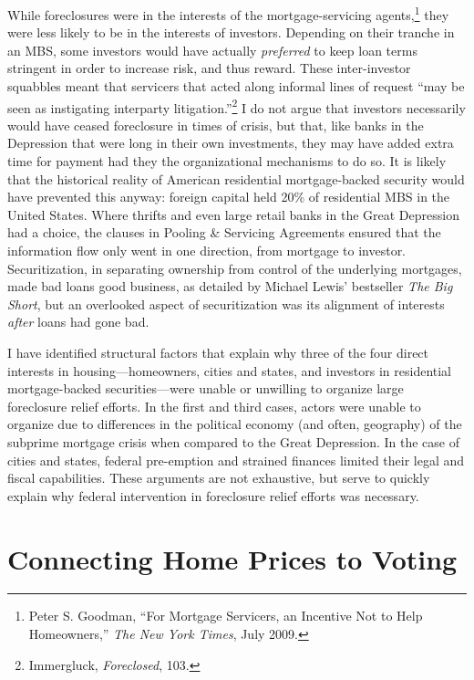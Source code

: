\documentclass[12pt,oneside]{psthesis}
\begin{document}
While foreclosures were in the interests of the mortgage-servicing agents,\footnote{Peter S. Goodman, ``For Mortgage Servicers, an Incentive Not to Help Homeowners,'' \emph{The New York Times}, July 2009.} they were less likely to be in the interests of investors.
Depending on their tranche in an MBS, some investors would have actually \emph{preferred} to keep loan terms stringent in order to increase risk, and thus reward.
These inter-investor squabbles meant that servicers that acted along informal lines of request ``may be seen as instigating interparty litigation.''\footnote{Immergluck, \emph{Foreclosed}, 103.}
I do not argue that investors necessarily would have ceased foreclosure in times of crisis, but that, like banks in the Depression that were long in their own investments, they may have added extra time for payment had they the organizational mechanisms to do so.
It is likely that the historical reality of American residential mortgage-backed security would have prevented this anyway: foreign capital held 20\% of residential MBS in the United States.
Where thrifts and even large retail banks in the Great Depression had a choice, the clauses in Pooling \& Servicing Agreements ensured that the information flow only went in one direction, from mortgage to investor.
Securitization, in separating ownership from control of the underlying mortgages, made bad loans good business, as detailed by Michael Lewis' bestseller \emph{The Big Short}, but an overlooked aspect of securitization was its alignment of interests \emph{after} loans had gone bad.

I have identified structural factors that explain why three of the four direct interests in housing---homeowners, cities and states, and investors in residential mortgage-backed securities---were unable or unwilling to organize large foreclosure relief efforts.
In the first and third cases, actors were unable to organize due to differences in the political economy (and often, geography) of the subprime mortgage crisis when compared to the Great Depression.
In the case of cities and states, federal pre-emption and strained finances limited their legal and fiscal capabilities.
These arguments are not exhaustive, but serve to quickly explain why federal intervention in foreclosure relief efforts was necessary.

\hypertarget{motive-opportunity}{%
\chapter{Connecting Home Prices to Voting}\label{motive-opportunity}}
\end{document}
